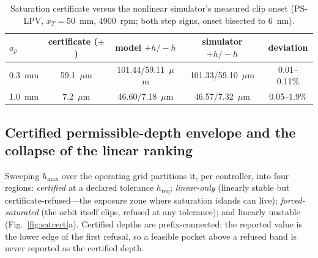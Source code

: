 \documentclass[preprint,12pt]{elsarticle}
\begin{document}
\begin{table}[t]
\centering\small
\caption{Saturation certificate versus the nonlinear simulator's
measured clip onset (PS-LPV, $x_T = 50$~mm, 4900~rpm; both step signs,
onset bisected to 6~nm).}
\label{tab:satvalid}
\begin{tabular}{lcccc}
\toprule
$a_p$ & certificate ($\pm$) & model $+h/-h$ & simulator $+h/-h$ &
deviation \\
\midrule
0.3~mm & 59.1~$\mu$m & 101.44/59.11~$\mu$m & 101.33/59.10~$\mu$m &
0.01--0.11\% \\
1.0~mm & 7.2~$\mu$m  & 46.60/7.18~$\mu$m  & 46.57/7.32~$\mu$m  &
0.05--1.9\% \\
\bottomrule
\end{tabular}
\end{table}

\subsection{Certified permissible-depth envelope and the collapse of
the linear ranking}
\label{sec:satenvelope}

Sweeping $h_{\max}$ over the operating grid partitions it, per
controller, into four regions: \emph{certified} at a declared
tolerance $h_{\mathrm{req}}$; \emph{linear-only} (linearly stable but
certificate-refused---the exposure zone where saturation islands can
live); \emph{forced-saturated} (the orbit itself clips, refused at any
tolerance); and linearly unstable (Fig.~\ref{fig:satcert}a). Certified
depths are prefix-connected: the reported value is the lower edge of
the first refusal, so a feasible pocket above a refused band is never
reported as the certified depth.
\end{document}
